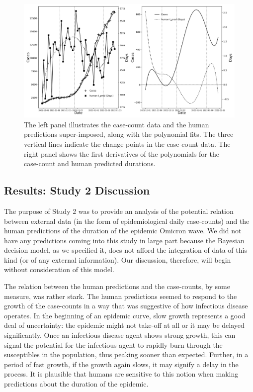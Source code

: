 \documentclass[a4paper,man,natbib]{apa6}
\begin{document}
\begin{figure}
    \centering
    \includegraphics[width=\linewidth]{Figures/Study_2_Figure.png}
    \caption{The left panel illustrates the case-count data and the human predictions super-imposed, along with the polynomial fits.  The three vertical lines indicate the change points in the case-count data.  The right panel shows the first derivatives of the polynomials for the case-count and human predicted durations.}
    \label{fig:Study_2_Multi}
\end{figure}

\subsection{Results: Study 2 Discussion}
The purpose of Study 2 was to provide an analysis of the potential relation between external data (in the form of epidemiological daily case-counts) and the human predictions of the duration of the epidemic Omicron wave.  We did not have any predictions coming into this study in large part because the Bayesian decision model, as we specified it, does not afford the integration of data of this kind (or of any external information). Our discussion, therefore, will begin without consideration of this model. 

The relation between the human predictions and the case-counts, by some measure, was rather stark.  The human predictions seemed to respond to the growth of the case-counts in a way that was suggestive of how infectious disease operates.  In the beginning of an epidemic curve, slow growth represents a good deal of uncertainty: the epidemic might not take-off at all or it may be delayed significantly. Once an infectious disease agent shows strong growth, this can signal the potential for the infectious agent to rapidly burn through the susceptibles in the population, thus peaking sooner than expected.  Further, in a period of fast growth, if the growth again slows, it may signify a delay in the process.  It is plausible that humans are sensitive to this notion when making predictions about the duration of the epidemic.  
\end{document}
